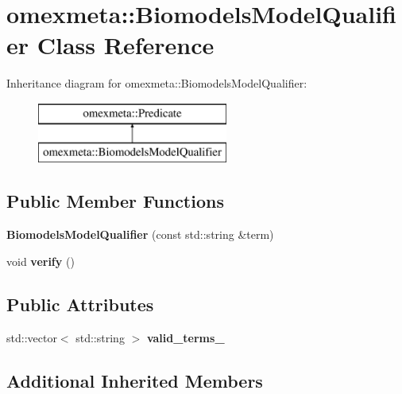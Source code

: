 \hypertarget{classomexmeta_1_1BiomodelsModelQualifier}{}\section{omexmeta\+:\+:Biomodels\+Model\+Qualifier Class Reference}
\label{classomexmeta_1_1BiomodelsModelQualifier}
Inheritance diagram for omexmeta\+:\+:Biomodels\+Model\+Qualifier\+:\begin{figure}[H]
\begin{center}
\leavevmode
\includegraphics[height=2.000000cm]{classomexmeta_1_1BiomodelsModelQualifier}
\end{center}
\end{figure}
\subsection*{Public Member Functions}
\begin{DoxyCompactItemize}
\item 
\mbox{\label{classomexmeta_1_1BiomodelsModelQualifier_a9842d4d8aa136cf4d617a53e12dc6f82}} 
{\bfseries Biomodels\+Model\+Qualifier} (const std\+::string \&term)
\item 
\mbox{\label{classomexmeta_1_1BiomodelsModelQualifier_a3d55d1629ea82f6bb20068818b462fee}} 
void {\bfseries verify} ()
\end{DoxyCompactItemize}
\subsection*{Public Attributes}
\begin{DoxyCompactItemize}
\item 
std\+::vector$<$ std\+::string $>$ {\bfseries valid\+\_\+terms\+\_\+}
\end{DoxyCompactItemize}
\subsection*{Additional Inherited Members}


